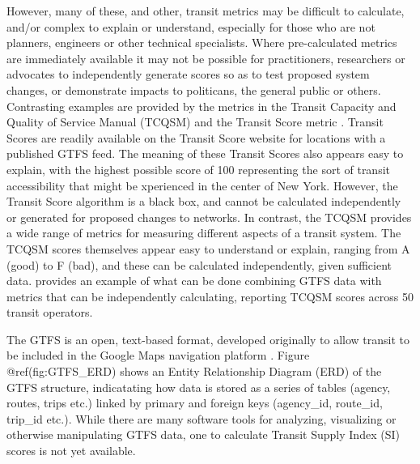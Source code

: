 \documentclass[preprint, 3p,
authoryear]{elsarticle} %
\begin{document}
However, many of these, and other, transit metrics may be difficult to
calculate, and/or complex to explain or understand, especially for those
who are not planners, engineers or other technical specialists. Where
pre-calculated metrics are immediately available it may not be possible
for practitioners, researchers or advocates to independently generate
scores so as to test proposed system changes, or demonstrate impacts to
politicans, the general public or others. Contrasting examples are
provided by the metrics in the Transit Capacity and Quality of Service
Manual (TCQSM) and the Transit Score metric \citep{WalkScore:2023tg}.
Transit Scores are readily available on the Transit Score website for
locations with a published GTFS feed. The meaning of these Transit
Scores also appears easy to explain, with the highest possible score of
100 representing the sort of transit accessibility that might be
xperienced in the center of New York. However, the Transit Score
algorithm is a black box, and cannot be calculated independently or
generated for proposed changes to networks. In contrast, the TCQSM
provides a wide range of metrics for measuring different aspects of a
transit system. The TCQSM scores themselves appear easy to understand or
explain, ranging from A (good) to F (bad), and these can be calculated
independently, given sufficient data. \citet{Wong:2013aa} provides an
example of what can be done combining GTFS data with metrics that can be
independently calculating, reporting TCQSM scores across 50 transit
operators.

The GTFS is an open, text-based format, developed originally to allow
transit to be included in the Google Maps navigation platform
\citep{GTFS}. Figure @ref(fig:GTFS\_ERD) shows an Entity Relationship
Diagram (ERD) of the GTFS structure, indicatating how data is stored as
a series of tables (agency, routes, trips etc.) linked by primary and
foreign keys (agency\_id, route\_id, trip\_id etc.). While there are
many software tools for analyzing, visualizing or otherwise manipulating
GTFS data, one to calculate Transit Supply Index (SI) scores is not yet
available.
\end{document}
